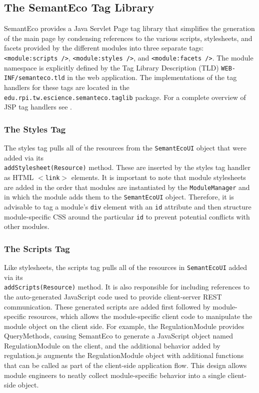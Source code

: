 \documentclass[letterpaper]{report}
\begin{document}
\subsection{The SemantEco Tag Library}
\label{tag-library}
SemantEco provides a Java Servlet Page tag library that simplifies the generation of the main page by condensing references to the various scripts, stylesheets, and facets provided by the different modules into three separate tags: \texttt{<module:scripts />}, \texttt{<module:styles />}, and \texttt{<module:facets />}. The module namespace is explicitly defined by the Tag Library Description (TLD) \texttt{WEB-INF/semanteco.tld} in the web application. The implementations of the tag handlers for these tags are located in the \\\texttt{edu.rpi.tw.escience.semanteco.taglib} package. For a complete overview of JSP tag handlers see \cite{JSPTagHandlers}.

\subsubsection{The Styles Tag}
The styles tag pulls all of the resources from the \texttt{SemantEcoUI} object that were added via its \\\texttt{addStylesheet(Resource)} method. These are inserted by the styles tag handler as HTML \texttt{$<$link$>$} elements. It is important to note that module stylesheets are added in the order that modules are instantiated by the \texttt{ModuleManager} and in which the module adds them to the \texttt{SemantEcoUI} object. Therefore, it is advisable to tag a module's \texttt{div} element with an \texttt{id} attribute and then structure module-specific CSS around the particular \texttt{id} to prevent potential conflicts with other modules.

\subsubsection{The Scripts Tag}
Like stylesheets, the scripts tag pulls all of the resources in \texttt{SemantEcoUI} added via its \\\texttt{addScripts(Resource)} method. It is also responsible for including references to the auto-generated JavaScript code used to provide client-server REST communication. These generated scripts are added first followed by module-specific resources, which allows the module-specific client code to manipulate the module object on the client side. For example, the RegulationModule provides QueryMethods, causing SemantEco to generate a JavaScript object named RegulationModule on the client, and the additional behavior added by regulation.js augments the RegulationModule object with additional functions that can be called as part of the client-side application flow. This design allows module engineers to neatly collect module-specific behavior into a single client-side object.
\end{document}
